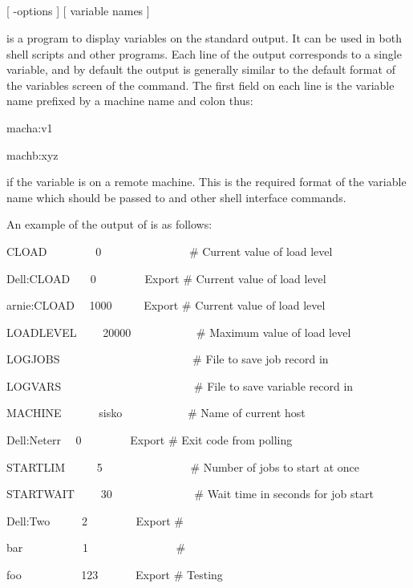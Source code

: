 \subsection{\BtvlistName}

\begin{expara}

\BtvlistName{} [ -options ] [ variable names ]

\end{expara}

\PrBtvlist{} is a program to display \ProductName{} variables on the standard output. It can be used in both shell scripts and other programs.
Each line of the output corresponds to a single variable, and by default the output is generally similar to the default format of the
variables screen of the \PrBtq{} command. The first field on each line is the variable name prefixed by a machine name and colon thus:

\begin{expara}

macha:v1

machb:xyz

\end{expara}

if the variable is on a remote machine. This is the required format of the variable name which should be passed to \PrBtvar{} and other shell interface commands.

An example of the output of \PrBtvlist{} is as follows:

\begin{exparasmall}

CLOAD \ \ \ \ \ \ \ \ 0 \ \ \ \ \ \ \ \ \ \ \ \ \ \ \ \# Current value
of load level

Dell:CLOAD \ \ \ 0 \ \ \ \ \ \ \ \ Export \# Current value of load
level

arnie:CLOAD \ \ 1000 \ \ \ \ \ Export \# Current value of load level

LOADLEVEL \ \ \ \ 20000 \ \ \ \ \ \ \ \ \ \ \ \# Maximum value of load
level

LOGJOBS \ \ \ \ \ \ \ \ \ \ \ \ \ \ \ \ \ \ \ \ \ \ \ \# File to save
job record in

LOGVARS \ \ \ \ \ \ \ \ \ \ \ \ \ \ \ \ \ \ \ \ \ \ \ \# File to save
variable record in

MACHINE \ \ \ \ \ \ sisko \ \ \ \ \ \ \ \ \ \ \ \# Name of current host

Dell:Neterr \ \ 0 \ \ \ \ \ \ \ \ Export \# Exit code from polling

STARTLIM \ \ \ \ \ 5 \ \ \ \ \ \ \ \ \ \ \ \ \ \ \ \# Number of jobs to
start at once

STARTWAIT \ \ \ \ 30 \ \ \ \ \ \ \ \ \ \ \ \ \ \ \# Wait time in seconds
for job start

Dell:Two \ \ \ \ \ 2 \ \ \ \ \ \ \ \ Export \#

bar \ \ \ \ \ \ \ \ \ \ 1 \ \ \ \ \ \ \ \ \ \ \ \ \ \ \ \#

foo \ \ \ \ \ \ \ \ \ \ 123 \ \ \ \ \ \ Export \# Testing

\end{exparasmall}

